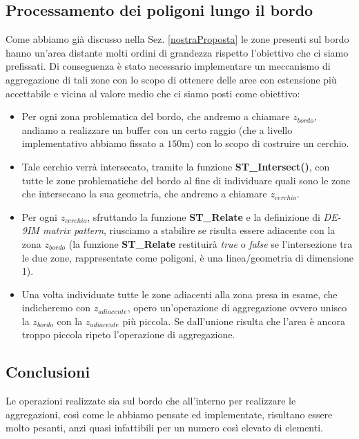 \subsection{Processamento dei poligoni lungo il bordo}
Come abbiamo già discusso nella Sez. \ref{nostraProposta} le zone presenti sul bordo hanno un'area distante molti ordini di grandezza rispetto l'obiettivo che ci siamo prefissati. Di conseguenza è stato necessario implementare un meccanismo di aggregazione di tali zone con lo scopo di ottenere delle aree con estensione più accettabile e vicina al valore medio che ci siamo posti come obiettivo: \newline
\begin{itemize}
\item Per ogni zona problematica del bordo, che andremo a chiamare $z_{bordo}$, andiamo a realizzare un buffer con un certo raggio (che a livello implementativo abbiamo fissato a $150$m) con lo scopo di costruire un cerchio.
\item Tale cerchio verrà intersecato, tramite la funzione \textbf{ST\_Intersect()}, con tutte le zone problematiche del bordo al fine di individuare quali sono le zone che intersecano la sua geometria, che andremo a chiamare $z_{cerchio}$.
\item Per ogni $z_{cerchio}$, sfruttando la funzione \textbf{ST\_Relate} e la definizione di \textit{DE-9IM matrix pattern}, riusciamo a stabilire se risulta essere adiacente con la zona $z_{bordo}$ (la funzione \textbf{ST\_Relate} restituirà \textit{true} o \textit{false} se l'intersezione tra le due zone, rappresentate come poligoni, è una linea/geometria di dimensione 1).
\item Una volta individuate tutte le zone adiacenti alla zona presa in esame, che indicheremo con $z_{adiacente}$, opero un'operazione di aggregazione ovvero unisco la $z_{bordo}$ con la $z_{adiacente}$ più piccola. Se dall'unione risulta che l'area è ancora troppo piccola ripeto l'operazione di aggregazione.
\end{itemize}
\subsection{Conclusioni}
Le operazioni realizzate sia sul bordo che all’interno per realizzare le aggregazioni, così come le abbiamo pensate ed implementate, risultano essere molto pesanti, anzi quasi infattibili per un numero così elevato di elementi.


